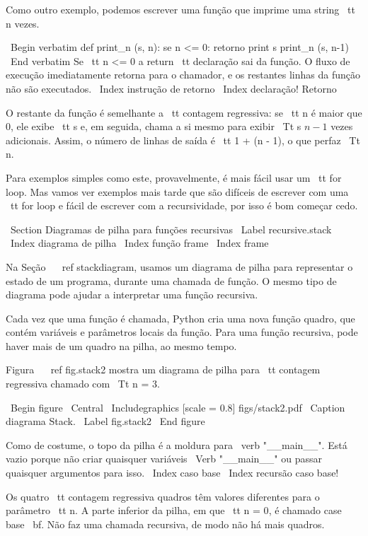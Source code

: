 \documentclass[10pt]{book}
\begin{document}
\begin {itemize}
{{Como outro exemplo, podemos escrever uma função que imprime uma
string {\ tt n} vezes.

\ Begin {verbatim}
def print_n (s, n):
    se n <= 0:
        retorno
    print s
    print_n (s, n-1)
\ End {verbatim}
%
Se {\ tt n <= 0} a {return \ tt} declaração sai da função. O
fluxo de execução imediatamente retorna para o chamador, e os restantes
linhas da função não são executados.
\ Index {instrução de retorno}
\ Index {declaração! Retorno}

O restante da função é semelhante a {\ tt contagem regressiva}: se {\ tt n} é
maior que 0, ele exibe {\ tt s} e, em seguida, chama a si mesmo para exibir
{\ Tt s} $ n-1 $ vezes adicionais. Assim, o número de linhas de saída
é {\ tt 1 + (n - 1)}, o que perfaz
{\ Tt n}.

Para exemplos simples como este, provavelmente, é mais fácil usar um {\ tt
for} loop. Mas vamos ver exemplos mais tarde que são difíceis de escrever
com uma {\ tt for} loop e fácil de escrever com a recursividade, por isso é
bom começar cedo.



\ Section {Diagramas de pilha para funções recursivas}
\ Label {} recursive.stack
\ Index {diagrama de pilha}
\ Index {função frame}
\ Index {frame}

Na Seção ~ \ ref {} stackdiagram, usamos um diagrama de pilha para representar
o estado de um programa, durante uma chamada de função. O mesmo tipo de
diagrama pode ajudar a interpretar uma função recursiva.

Cada vez que uma função é chamada, Python cria uma nova função
quadro, que contém variáveis ​​e parâmetros locais da função.
Para uma função recursiva, pode haver mais de um quadro na
pilha, ao mesmo tempo.

Figura ~ \ ref {} fig.stack2 mostra um diagrama de pilha para {\ tt contagem regressiva} chamado com
{\ Tt n = 3}.

\ Begin {figure}
\ Central
{\ Includegraphics [scale = 0.8] {figs/stack2.pdf}}
\ Caption {diagrama Stack.}
\ Label {} fig.stack2
\ End {figure}


Como de costume, o topo da pilha é a moldura para \ verb "__main__".
Está vazio porque não criar quaisquer variáveis 
\ Verb "__main__" ou passar quaisquer argumentos para isso.
\ Index {caso base}
\ Index {recursão caso base!}

Os quatro {\ tt contagem regressiva} quadros têm valores diferentes para o
parâmetro {\ tt n}. A parte inferior da pilha, em que {\ tt n = 0}, é
chamado {case base \ bf}. Não faz uma chamada recursiva, de modo
não há mais quadros.

}}
\end{itemize}
\end{document}
